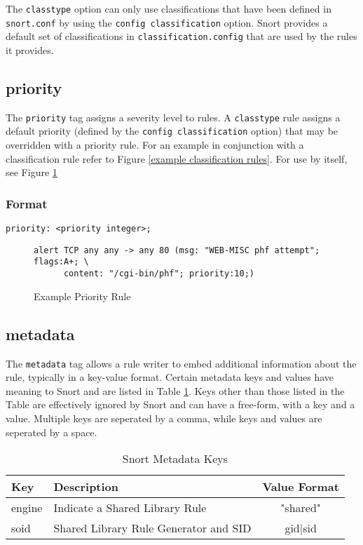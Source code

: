 \documentclass[english]{report}
\begin{document}
The \texttt{classtype} option can only use classifications that have been defined in \texttt{snort.conf}
by using the \texttt{config classification} option.  Snort provides a default set of classifications
in \texttt{classification.config} that are used by the rules it provides.

\subsection{priority}

The \texttt{priority} tag assigns a severity level to rules. A \texttt{classtype} rule
assigns a default priority (defined by the \texttt{config classification} option) 
that may be overridden with a priority
rule. For an example in conjunction with a classification rule refer
to Figure \ref{example classification rules}. For use by itself,
see Figure \ref{example priority rule}


\subsubsection{Format}

\begin{verbatim}
priority: <priority integer>;
\end{verbatim}

\begin{figure}[!hbpt]
\begin{verbatim}
alert TCP any any -> any 80 (msg: "WEB-MISC phf attempt"; flags:A+; \
      content: "/cgi-bin/phf"; priority:10;)
\end{verbatim}

\caption{Example Priority Rule\label{example priority rule}}
\end{figure}

\subsection{metadata}
The \texttt{metadata} tag allows a rule writer to embed additional information about the rule, typically in a key-value format.  Certain metadata keys and values have meaning to Snort and are listed in Table \ref{Snort Metadata Keys}.  Keys other than those listed in the Table are effectively ignored by Snort and can have a free-form, with a key and a value.  Multiple keys are seperated by a comma, while keys and values are seperated by a space.

\begin{center}
\begin{longtable}{|p{1in}|p{2.5in}|c|}
\caption{Snort Metadata Keys \label{Snort Metadata Keys}} \\
\hline 
Key & Description & Value Format \\
\hline
\hline
engine &
Indicate a Shared Library Rule & "shared" \\
\hline 
soid &
Shared Library Rule Generator and SID & gid$|$sid \\
\hline 
\end{longtable}
\end{center}
\end{document}
